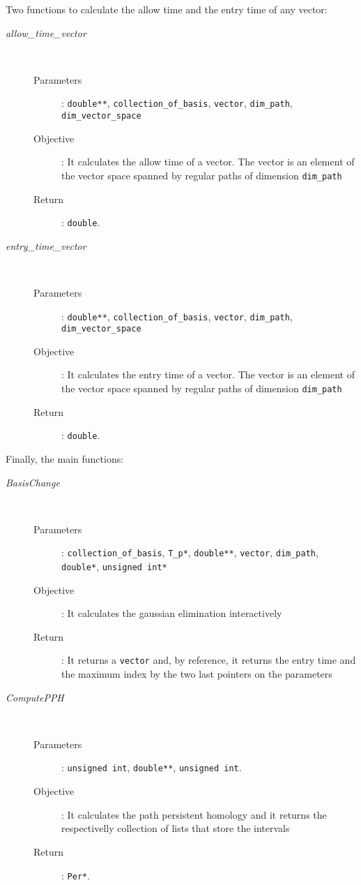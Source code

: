 \documentclass[11pt,a4paper]{article}
\begin{document}
Two functions to calculate the allow time and the entry time of any vector:
\begin{description}
	\item [\textit{allow\_time\_vector}] \hfill \\[-0.5cm]
		\begin{description}
			\item [Parameters]: \texttt{double**}, \texttt{collection\_of\_basis},
				\texttt{vector}, \texttt{dim\_path}, \texttt{dim\_vector\_space}
			\item [Objective]: It calculates the allow time of a vector. The 
				vector is an element of the vector space spanned by regular 
				paths of dimension \texttt{dim\_path}
			\item [Return]: \texttt{double}.
		\end{description}

	\item [\textit{entry\_time\_vector}] \hfill \\[-0.5cm]
		\begin{description}
			\item [Parameters]: \texttt{double**}, \texttt{collection\_of\_basis},
				\texttt{vector}, \texttt{dim\_path}, \texttt{dim\_vector\_space}
			\item [Objective]: It calculates the entry time of a vector. The 
				vector is an element of the vector space spanned by regular 
				paths of dimension \texttt{dim\_path}
			\item [Return]: \texttt{double}.
		\end{description}
\end{description}

Finally, the main functions:
\begin{description}
	\item [\textit{BasisChange}] \hfill \\[-0.5cm]
		\begin{description}
			\item [Parameters]: \texttt{collection\_of\_basis}, \texttt{T\_p*}, \texttt{double**},
				\texttt{vector}, \texttt{dim\_path}, \texttt{double*}, \texttt{unsigned int*}
			\item [Objective]: It calculates the gaussian elimination
				interactively
			\item [Return]: It returns a \texttt{vector} and, by reference,
				it returns the entry time and the maximum index by the
				two last pointers on the parameters
		\end{description}

	\item [\textit{ComputePPH}] \hfill \\[-0.5cm]
		\begin{description}
			\item [Parameters]: \texttt{unsigned int}, \texttt{double**}, \texttt{unsigned int}.
			\item [Objective]: It calculates the path persistent homology
				and it returns the respectivelly collection of lists that
				store the intervals
			\item [Return]: \texttt{Per*}.
		\end{description}
\end{description}


\end{document}

